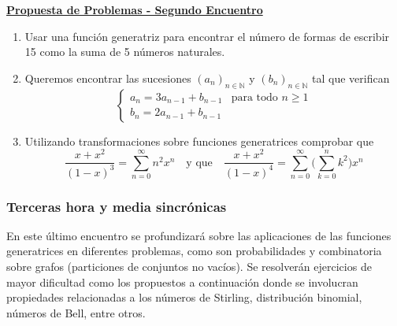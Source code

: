\bigskip
\begin{center}
	\begin{minipage}{0.8\linewidth}
		\begin{center}
			\underline{\textbf{Propuesta de Problemas - Segundo Encuentro}}
		\end{center}
		
		\begin{enumerate}
			\item Usar una función generatriz para encontrar el número de formas de escribir 15 como la suma de 5 números naturales.
			\item Queremos encontrar las sucesiones $(a_n)_{n \in \mathbb{N}}$ y $(b_n)_{n \in \mathbb{N}}$ tal que verifican $$\begin{cases}
				a_n = 3 a_{n - 1} + b_{n-1} & \text{para todo $n \ge 1$}\\
				b_n = 2 a_{n-1} + b_{n-1} &\
			\end{cases}$$
			\item Utilizando transformaciones sobre funciones generatrices comprobar que $$\frac{x+ x^2}{(1 - x)^3} = \sum_{n = 0}^{\infty} n^2 x^n \quad \text{y que} \quad \frac{x + x^2}{(1 - x)^4} = \sum_{n = 0}^{\infty} \Biggl( \sum_{k = 0}^{n} k^2 \Biggr) x^n$$
		\end{enumerate}
	\end{minipage}
\end{center}
\bigskip

\subsubsection{Terceras hora y media sincrónicas}

En este último encuentro se profundizará sobre las aplicaciones de las funciones generatrices en diferentes problemas, como son probabilidades y combinatoria sobre grafos (particiones de conjuntos no vacíos). Se resolverán ejercicios de mayor dificultad como los propuestos a continuación donde se involucran propiedades relacionadas a los números de Stirling, distribución binomial, números de Bell, entre otros.

